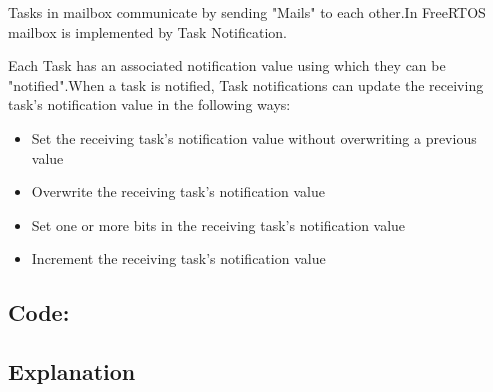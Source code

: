 \documentclass[11pt,a4paper]{article}
\begin{document}
   Tasks in mailbox communicate by sending "Mails" to each other.In FreeRTOS mailbox is implemented by Task Notification.
   
   Each Task has an associated notification value using which they can be "notified".When a task is notified, Task notifications can update the receiving task's notification value in the following ways:
   \begin{itemize}
   	 
\item Set the receiving task's notification value without overwriting a previous value
\item Overwrite the receiving task's notification value
\item Set one or more bits in the receiving task's notification value
\item Increment the receiving task's notification value 
   
   \end{itemize}
   \newpage
   \subsection{Code:}
   	
   \newpage
   
   \subsection{Explanation}
   
\end{document}
